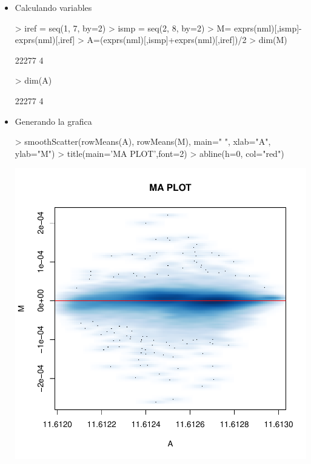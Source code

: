 \documentclass[12pt]{article}
\begin{document}
\begin{itemize}
\item{Calculando variables}
\begin{Schunk}
\begin{Sinput}
> iref = seq(1, 7, by=2)
> ismp = seq(2, 8, by=2)
> M= exprs(nml)[,ismp]-exprs(nml)[,iref]
> A=(exprs(nml)[,ismp]+exprs(nml)[,iref])/2
> dim(M)
\end{Sinput}
\begin{Soutput}
[1] 22277     4
\end{Soutput}
\begin{Sinput}
> dim(A)
\end{Sinput}
\begin{Soutput}
[1] 22277     4
\end{Soutput}
\end{Schunk}
\item{Generando la grafica}
\begin{Schunk}
\begin{Sinput}
> smoothScatter(rowMeans(A), rowMeans(M), main=" ", xlab="A", ylab="M")
> title(main='MA PLOT',font=2)
> abline(h=0, col="red")
\end{Sinput}
\end{Schunk}
\includegraphics{JuanHenao_Taller3-007}
\end{itemize}
\end{document}
